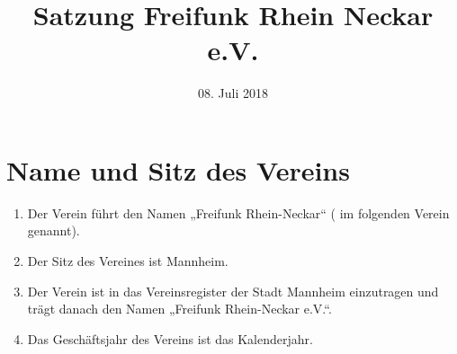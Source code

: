 \documentclass[12pt,a4paper,titlepage]{scrartcl}
\date{08. Juli 2018}
\title{Satzung Freifunk Rhein Neckar e.V.}
\begin{document}
\maketitle
{}
\thispagestyle{empty}
\newpage
{}
\setcounter{page}{1}

\section{Name und Sitz des Vereins}
\begin{enumerate}
\item Der Verein führt den Namen „Freifunk Rhein-Neckar“ ( im folgenden Verein genannt).
\item Der Sitz des Vereines ist Mannheim.
\item Der Verein ist in das Vereinsregister der Stadt Mannheim einzutragen und trägt 
danach den Namen „Freifunk Rhein-Neckar e.V.“.
\item Das Geschäftsjahr des Vereins ist das Kalenderjahr. 
\end{enumerate}
\end{document}
